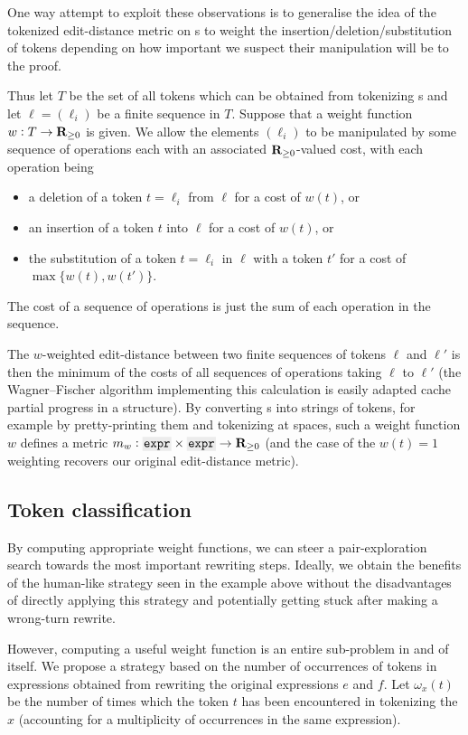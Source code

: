 \documentclass[12pt]{easychair}
\begin{document}
One way attempt to exploit these observations is to generalise the idea of the tokenized edit-distance metric on s to weight the insertion/deletion/substitution of tokens depending on how important we suspect their manipulation will be to the proof.

Thus let $T$ be the set of all tokens which can be obtained from tokenizing \expr{}s and let $\ell = (\ell_i)$ be a finite sequence in $T$. Suppose that a weight function $w : T \to \mathbf{R}_{\geq 0}$ is given. We allow the elements $(\ell_i)$ to be manipulated by some sequence of operations each with an associated $\mathbf{R}_{\geq 0}$-valued cost, with each operation being
\begin{itemize}
  \item a deletion of a token $t = \ell_i$ from $\ell$ for a cost of $w(t)$, or
  \item an insertion of a token $t$ into $\ell$ for a cost of $w(t)$, or
  \item the substitution of a token $t = \ell_i$ in $\ell$ with a token $t'$ for a cost of $\max\{w(t), w(t')\}$.
\end{itemize}
The cost of a sequence of operations is just the sum of each operation in the sequence.

The $w$-weighted edit-distance between two finite sequences of tokens $\ell$ and $\ell'$ is then the minimum of the costs of all sequences of operations taking $\ell$ to $\ell'$ (the Wagner--Fischer algorithm \cite{wagner1974string} implementing this calculation is easily adapted cache partial progress in a  structure). By converting \expr{}s{} into strings of tokens, for example by pretty-printing them and tokenizing at spaces, such a weight function $w$ defines a metric $m_w : \expr{} \times \expr{} \to \RR_{\geq 0}$ (and the case of the $w(t) = 1$ weighting recovers our original edit-distance metric).

\subsection{Token classification}

By computing appropriate weight functions, we can steer a pair-exploration search towards the most important rewriting steps. Ideally, we obtain the benefits of the human-like strategy seen in the example above without the disadvantages of directly applying this strategy and potentially getting stuck after making a wrong-turn rewrite.

However, computing a useful weight function is an entire sub-problem in and of itself. We propose a strategy based on the number of occurrences of tokens in expressions obtained from rewriting the original expressions $e$ and $f$. Let $\omega_x(t)$ be the number of times which the token $t$ has been encountered in tokenizing the \expr{} $x$ (accounting for a multiplicity of occurrences in the same expression).
\end{document}

